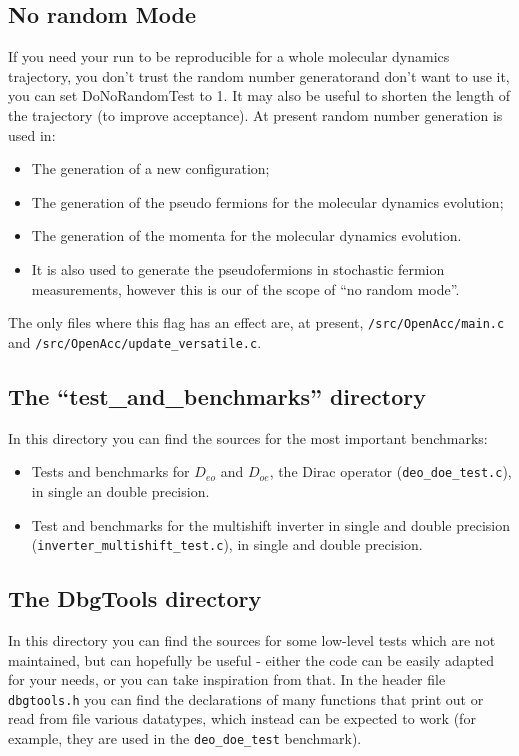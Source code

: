 \subsection{ No random Mode}
If you need your run to be reproducible for a whole molecular dynamics 
trajectory, you don't trust the random number generatorand don't want to use 
it, you can set {\sf DoNoRandomTest } to 1. It may also be useful to shorten the length of the trajectory (to improve acceptance).
At present random number generation is used in:
\begin{itemize}
    \item The generation of a new configuration;
    \item The generation of the pseudo fermions for the molecular dynamics 
        evolution;
    \item The generation of the momenta for the molecular dynamics evolution.
    \item It is also used to generate the pseudofermions in stochastic fermion 
        measurements, however this is our of the scope of ``no random mode''.
\end{itemize}
The only files where this flag has an effect are, at present, 
\verb|/src/OpenAcc/main.c| and \verb|/src/OpenAcc/update_versatile.c|. 


\subsection{The ``test\_and\_benchmarks'' directory}
In this directory you can find the sources for the most important benchmarks:
\begin{itemize}
    \item Tests and benchmarks for $D_{eo}$ and $D_{oe}$, the Dirac 
        operator (\verb|deo_doe_test.c|), in single an double precision.
    \item Test and benchmarks for the multishift inverter in single and double 
precision (\verb|inverter_multishift_test.c|), in single and double precision. 
\end{itemize}

\subsection{The DbgTools directory}
In this directory you can find the sources for some low-level tests
which are not maintained, but can hopefully be useful - either the code can be easily 
adapted for your needs, or you can take inspiration from that. 
In the header file \verb|dbgtools.h| you can find the declarations of many 
functions that print out or read from file various datatypes, which instead can be expected 
to work (for example, they are used in the \verb|deo_doe_test| benchmark).

